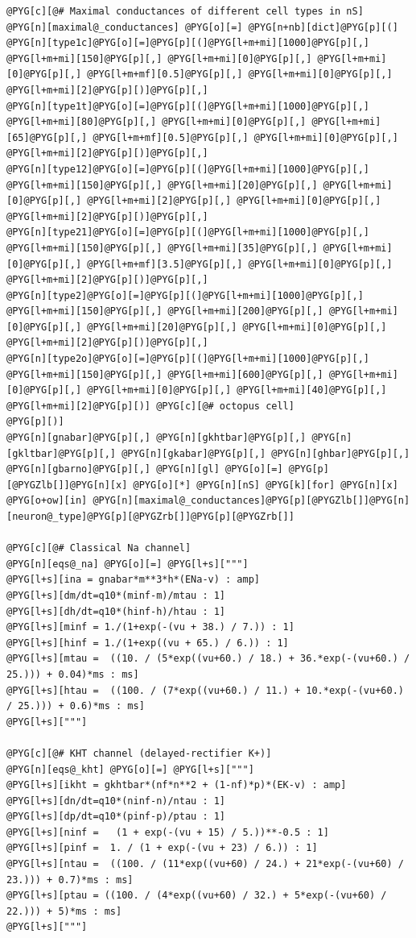 \documentclass[letterpaper,10pt,english]{manual}
\begin{document}
\begin{Verbatim}[commandchars=@\[\]]
@PYG[c][@# Maximal conductances of different cell types in nS]
@PYG[n][maximal@_conductances] @PYG[o][=] @PYG[n+nb][dict]@PYG[p][(]
@PYG[n][type1c]@PYG[o][=]@PYG[p][(]@PYG[l+m+mi][1000]@PYG[p][,] @PYG[l+m+mi][150]@PYG[p][,] @PYG[l+m+mi][0]@PYG[p][,] @PYG[l+m+mi][0]@PYG[p][,] @PYG[l+m+mf][0.5]@PYG[p][,] @PYG[l+m+mi][0]@PYG[p][,] @PYG[l+m+mi][2]@PYG[p][)]@PYG[p][,]
@PYG[n][type1t]@PYG[o][=]@PYG[p][(]@PYG[l+m+mi][1000]@PYG[p][,] @PYG[l+m+mi][80]@PYG[p][,] @PYG[l+m+mi][0]@PYG[p][,] @PYG[l+m+mi][65]@PYG[p][,] @PYG[l+m+mf][0.5]@PYG[p][,] @PYG[l+m+mi][0]@PYG[p][,] @PYG[l+m+mi][2]@PYG[p][)]@PYG[p][,]
@PYG[n][type12]@PYG[o][=]@PYG[p][(]@PYG[l+m+mi][1000]@PYG[p][,] @PYG[l+m+mi][150]@PYG[p][,] @PYG[l+m+mi][20]@PYG[p][,] @PYG[l+m+mi][0]@PYG[p][,] @PYG[l+m+mi][2]@PYG[p][,] @PYG[l+m+mi][0]@PYG[p][,] @PYG[l+m+mi][2]@PYG[p][)]@PYG[p][,]
@PYG[n][type21]@PYG[o][=]@PYG[p][(]@PYG[l+m+mi][1000]@PYG[p][,] @PYG[l+m+mi][150]@PYG[p][,] @PYG[l+m+mi][35]@PYG[p][,] @PYG[l+m+mi][0]@PYG[p][,] @PYG[l+m+mf][3.5]@PYG[p][,] @PYG[l+m+mi][0]@PYG[p][,] @PYG[l+m+mi][2]@PYG[p][)]@PYG[p][,]
@PYG[n][type2]@PYG[o][=]@PYG[p][(]@PYG[l+m+mi][1000]@PYG[p][,] @PYG[l+m+mi][150]@PYG[p][,] @PYG[l+m+mi][200]@PYG[p][,] @PYG[l+m+mi][0]@PYG[p][,] @PYG[l+m+mi][20]@PYG[p][,] @PYG[l+m+mi][0]@PYG[p][,] @PYG[l+m+mi][2]@PYG[p][)]@PYG[p][,]
@PYG[n][type2o]@PYG[o][=]@PYG[p][(]@PYG[l+m+mi][1000]@PYG[p][,] @PYG[l+m+mi][150]@PYG[p][,] @PYG[l+m+mi][600]@PYG[p][,] @PYG[l+m+mi][0]@PYG[p][,] @PYG[l+m+mi][0]@PYG[p][,] @PYG[l+m+mi][40]@PYG[p][,] @PYG[l+m+mi][2]@PYG[p][)] @PYG[c][@# octopus cell]
@PYG[p][)]
@PYG[n][gnabar]@PYG[p][,] @PYG[n][gkhtbar]@PYG[p][,] @PYG[n][gkltbar]@PYG[p][,] @PYG[n][gkabar]@PYG[p][,] @PYG[n][ghbar]@PYG[p][,] @PYG[n][gbarno]@PYG[p][,] @PYG[n][gl] @PYG[o][=] @PYG[p][@PYGZlb[]]@PYG[n][x] @PYG[o][*] @PYG[n][nS] @PYG[k][for] @PYG[n][x] @PYG[o+ow][in] @PYG[n][maximal@_conductances]@PYG[p][@PYGZlb[]]@PYG[n][neuron@_type]@PYG[p][@PYGZrb[]]@PYG[p][@PYGZrb[]]

@PYG[c][@# Classical Na channel]
@PYG[n][eqs@_na] @PYG[o][=] @PYG[l+s]["""]
@PYG[l+s][ina = gnabar*m**3*h*(ENa-v) : amp]
@PYG[l+s][dm/dt=q10*(minf-m)/mtau : 1]
@PYG[l+s][dh/dt=q10*(hinf-h)/htau : 1]
@PYG[l+s][minf = 1./(1+exp(-(vu + 38.) / 7.)) : 1]
@PYG[l+s][hinf = 1./(1+exp((vu + 65.) / 6.)) : 1]
@PYG[l+s][mtau =  ((10. / (5*exp((vu+60.) / 18.) + 36.*exp(-(vu+60.) / 25.))) + 0.04)*ms : ms]
@PYG[l+s][htau =  ((100. / (7*exp((vu+60.) / 11.) + 10.*exp(-(vu+60.) / 25.))) + 0.6)*ms : ms]
@PYG[l+s]["""]

@PYG[c][@# KHT channel (delayed-rectifier K+)]
@PYG[n][eqs@_kht] @PYG[o][=] @PYG[l+s]["""]
@PYG[l+s][ikht = gkhtbar*(nf*n**2 + (1-nf)*p)*(EK-v) : amp]
@PYG[l+s][dn/dt=q10*(ninf-n)/ntau : 1]
@PYG[l+s][dp/dt=q10*(pinf-p)/ptau : 1]
@PYG[l+s][ninf =   (1 + exp(-(vu + 15) / 5.))**-0.5 : 1]
@PYG[l+s][pinf =  1. / (1 + exp(-(vu + 23) / 6.)) : 1]
@PYG[l+s][ntau =  ((100. / (11*exp((vu+60) / 24.) + 21*exp(-(vu+60) / 23.))) + 0.7)*ms : ms]
@PYG[l+s][ptau = ((100. / (4*exp((vu+60) / 32.) + 5*exp(-(vu+60) / 22.))) + 5)*ms : ms]
@PYG[l+s]["""]


\end{Verbatim}
\end{document}
